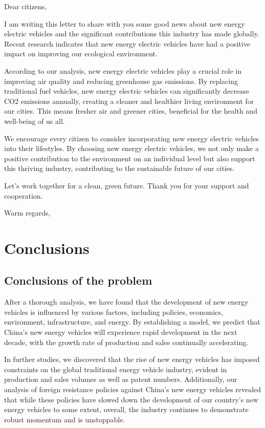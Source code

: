 \documentclass{apmcmthesis}
\begin{document}
\noindent Dear citizens,

I am writing this letter to share with you some good news about new energy electric vehicles and the significant contributions this industry has made globally. Recent research indicates that new energy electric vehicles have had a positive impact on improving our ecological environment.

According to our analysis, new energy electric vehicles play a crucial role in improving air quality and reducing greenhouse gas emissions. By replacing traditional fuel vehicles, new energy electric vehicles can significantly decrease CO2 emissions annually, creating a cleaner and healthier living environment for our cities. This means fresher air and greener cities, beneficial for the health and well-being of us all.

We encourage every citizen to consider incorporating new energy electric vehicles into their lifestyles. By choosing new energy electric vehicles, we not only make a positive contribution to the environment on an individual level but also support this thriving industry, contributing to the sustainable future of our cities.

Let's work together for a clean, green future. Thank you for your support and cooperation.

Warm regards,

\section{Conclusions}

\subsection{Conclusions of the problem}
After a thorough analysis, we have found that the development of new energy vehicles is influenced by various factors, including policies, economics, environment, infrastructure, and energy. By establishing a model, we predict that China's new energy vehicles will experience rapid development in the next decade, with the growth rate of production and sales continually accelerating.

In further studies, we discovered that the rise of new energy vehicles has imposed constraints on the global traditional energy vehicle industry, evident in production and sales volumes as well as patent numbers. Additionally, our analysis of foreign resistance policies against China's new energy vehicles revealed that while these policies have slowed down the development of our country's new energy vehicles to some extent, overall, the industry continues to demonstrate robust momentum and is unstoppable.
\end{document}
